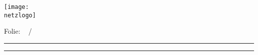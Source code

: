 {
	\hspace*{0.02\textwidth}
	\begin{minipage}[m]{0.3\textwidth}
		\vspace*{1ex}
		\texttt{[image: \\netzlogo]}
	\end{minipage}
	\begin{minipage}[m]{0.35\textwidth}
		\centering
		\vspace*{3ex}
		\doctitle
	\end{minipage}
	\hfill
	\begin{minipage}[m]{0.14\textwidth}
		\vspace*{3ex}
		 \hfill Folie:  \insertframenumber ~ / \inserttotalframenumber
		\hspace*{0.1\textwidth}
	\end{minipage}
	\color{\mainColor}
	\rule{\paperwidth}{1pt}
}
%
%
%
{
	\color{\mainColor }
	\rule{\paperwidth}{1pt}
	\color{black}
	\begin{minipage}[c]{\textwidth}
		\vspace*{1ex}
		\hspace*{0.02\textwidth} \docauthor \hfill  {} \hspace{0.02\textwidth}
		\vspace*{2ex}
	\end{minipage}
}